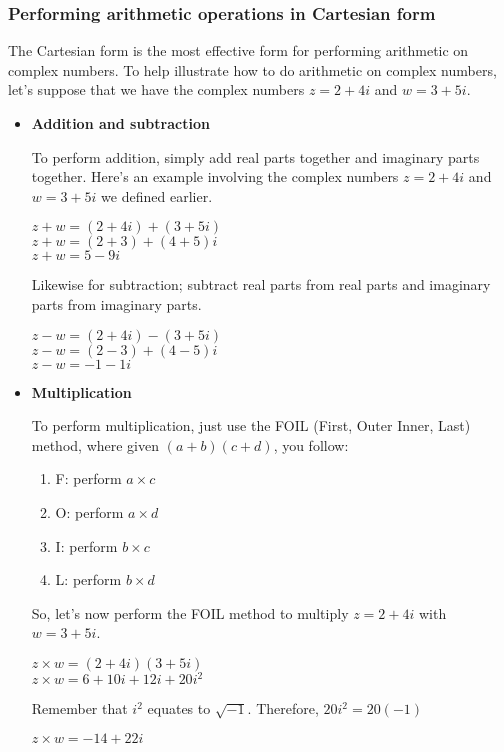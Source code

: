 \documentclass{article}
\begin{document}
\subsubsection{Performing arithmetic operations     in Cartesian form}
The Cartesian form  is the most effective form for performing arithmetic on complex numbers. To help illustrate how to do arithmetic on complex numbers, let's suppose that we have the complex numbers $z=2+4i$ and $w=3+5i$.

\begin{itemize}
    \item \textbf{Addition and subtraction}
    
    To perform addition, simply add real parts together and imaginary parts together. Here's an example involving the complex numbers $z=2+4i$ and $w=3+5i$ we defined earlier.
    
    $z + w = (2+4i) + (3+5i)$ \\
    $z + w = (2+3) + (4+5)i$ \\
    $z + w = 5-9i $

    Likewise for subtraction; subtract real parts from real parts and imaginary parts from imaginary parts.

    $z - w = (2+4i) - (3+5i)$ \\
    $z - w = (2-3) + (4-5)i$ \\
    $z - w = -1 -1i$

    \item \textbf{Multiplication}
    
    To perform multiplication, just use the FOIL (First, Outer Inner, Last) method, where given $(a+b)(c+d)$, you follow:
    
    \begin{enumerate}
        \item F: perform $a\times c$
        \item O: perform $a\times d$
        \item I: perform $b\times c$
        \item L: perform $b\times d$
    \end{enumerate}
    So, let's now perform the FOIL method to multiply $z=2+4i$ with $w=3+5i$.

    $z \times w = (2+4i)(3+5i)$ \\
    $z \times w = 6+10i+12i+20i^2$

    Remember that $i^2$ equates to $\sqrt{-1}$. Therefore, $20i^2=20(-1)$
    
    $z \times w = -14 + 22i$


\end{itemize}
\end{document}
